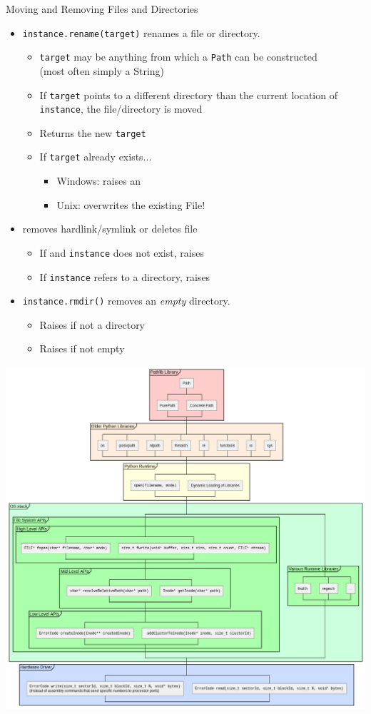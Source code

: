 \begin{frame}{Moving and Removing Files and Directories}
%
\begin{itemize}
\item \texttt{instance.rename(target)} renames a file or directory.
	\begin{itemize}
	\item \texttt{target} may be anything from which a \texttt{Path} can be constructed \\
		(most often simply a String)
	\item If \texttt{target} points to a different directory than the current location of \texttt{instance}, the file/directory is moved
	\item Returns the new \texttt{target}
	\item If \texttt{target} already exists...
		\begin{itemize}
		\item Windows: raises an 
		\item Unix: overwrites the existing File!
		\end{itemize}
	\end{itemize}
\item {} removes hardlink/symlink or deletes file
	\begin{itemize}
	\item If  and \texttt{instance} does not exist, raises 
	\item If \texttt{instance} refers to a directory, raises 
	\end{itemize}
\item \texttt{instance.rmdir()} removes an \emph{empty} directory.
	\begin{itemize}
	\item Raises  if not a directory
	\item Raises  if not empty
	\end{itemize}
\end{itemize}
%
\end{frame}


\begin{frame}
%
\vspace{-16pt}
\begin{center}
\includegraphics[width=.66\linewidth]{./gfx/14-pathlib-stack}
\end{center}
%
\end{frame}


